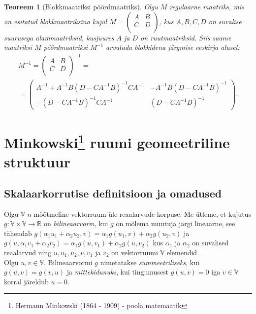 \documentclass[a4paper,12pt]{article}
\theoremstyle{plain}
\newtheorem{teoreem}{Teoreem}[section]
\theoremstyle{definition}
\numberwithin{equation}{section}
\begin{document}
\begin{teoreem}[Blokkmaatriksi pöördmaatriks]
Olgu $M$ regulaarne maatriks, mis on esitatud blokkmaatriksina kujul $M = \begin{pmatrix} A & B \\ C & D \\ \end{pmatrix}$, kus $A, B, C, D$ on suvalise suurusega alammaatriksid, kusjuures $A$ ja $D$ on ruutmaatriksid. Siis saame maatriksi $M$ pöördmaatriksi $M^{-1}$ arvutada blokkidena järgmise eeskirja alusel:
\begin{align*}
M^{-1} = \begin{pmatrix}
A & B \\ C & D \\
\end{pmatrix}^{-1} = \qquad\qquad\qquad\qquad\qquad \\
= \begin{pmatrix}
A^{-1}+A^{-1}B\left(D-CA^{-1}B\right)^{-1}CA^{-1} & -A^{-1}B\left(D-CA^{-1}B\right)^{-1} \\
-\left(D- CA^{-1}B\right)^{-1}CA^{-1} & \left(D-CA^{-1}B\right)^{-1}
\end{pmatrix}.
\end{align*}
\end{teoreem}
\newpage

\section{Minkowski\footnote{Hermann Minkowski (1864 - 1909) - poola matemaatik} ruumi geomeetriline struktuur}

\subsection{Skalaarkorrutise definitsioon ja omadused}

Olgu $\mathbb{V}$ $n$-mõõtmeline vektorruum üle reaalarvude korpuse. Me ütleme, et kujutus $g : \mathbb{V} \times \mathbb{V} \rightarrow \mathbb{R}$ on \emph{bilineaarvorm}, kui $g$ on mõlema muutuja järgi lineaarne, see tähendab $g \left( \alpha_1 u_1 + \alpha_2 u_2, v \right) = \alpha_1 g \left( u_1, v \right) + \alpha_2 g \left( u_2, v \right)$ ja $g \left( u, \alpha_1 v_1 + \alpha_2 v_2 \right) = \alpha_1 g \left( u, v_1 \right) + \alpha_2 g \left( u, v_2 \right)$ kus $\alpha_1$ ja $\alpha_2$ on suvalised reaalarvud ning $u, u_1, u_2, v, v_1$ ja $v_2$ on vektorruumi $\mathbb{V}$ elemendid. 
\\
Olgu $u, v \in \mathbb{V}$. Bilineaarvormi $g$ nimetatakse \emph{sümmeetriliseks}, kui $g \left( u, v \right) = g \left(v, u \right)$ ja \emph{mittekidunuks}, kui tingumusest $g \left( u, v \right) = 0$ iga $v \in \mathbb{V}$ korral järeldub  $u = 0$.
\end{document}
